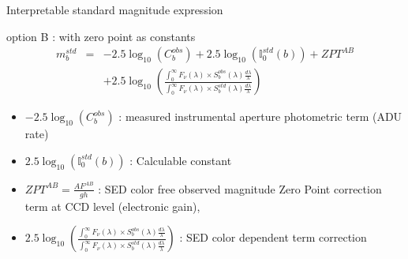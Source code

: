 \documentclass{beamer}
\begin{document}
\begin{frame}{Interpretable standard magnitude expression}
\begin{alertblock}{option B : with zero point as constants}
\begin{eqnarray}
m_b^{std} & = &  -2.5 \log_{10}(C_b^{obs})+ 2.5 \log_{10}\left(\mathbb{I}_0^{std}(b)\right) + ZPT^{AB}   \nonumber \\
 & & + 2.5 \log_{10} 
	\left( 
	\frac{\int_0^\infty F_\nu(\lambda) \times S_b^{obs}(\lambda) \frac{d\lambda}{\lambda} }{\int_0^\infty F_\nu(\lambda) \times S_b^{std}(\lambda) \frac{d\lambda}{\lambda}} 
	\right)
\end{eqnarray}
\end{alertblock}
\begin{itemize}
\item $-2.5 \log_{10}(C_b^{obs})$ : measured instrumental aperture photometric term (ADU rate)
\item $2.5 \log_{10}\left(\mathbb{I}_0^{std}(b)\right)$ : Calculable constant
\item $ZPT^{AB} = \frac{A F^{AB}}{gh}$ :  SED color free observed magnitude Zero Point correction term at CCD level (electronic gain),
\item $2.5 \log_{10} 
	\left( 
	\frac{\int_0^\infty F_\nu(\lambda) \times S_b^{obs}(\lambda) \frac{d\lambda}{\lambda} }{\int_0^\infty F_\nu(\lambda) \times S_b^{std}(\lambda) \frac{d\lambda}{\lambda}}\right)$ : SED color dependent term correction
\end{itemize}
\end{frame}
\end{document}
